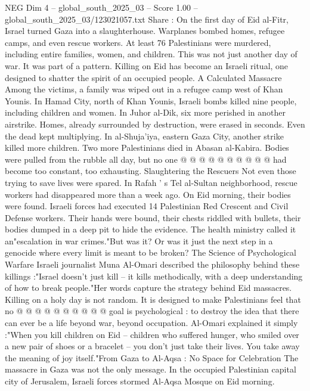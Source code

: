 \begin{textsample}{NEG Dim 4 – global\_south\_2025\_03 – Score 1.00 – global\_south\_2025\_03/123021057.txt}  \label{ex:f4_neg_427}
Share : On the first day of Eid al-Fitr, Israel turned Gaza into a slaughterhouse.
Warplanes bombed homes, refugee camps, and even rescue workers.
At least 76 Palestinians were murdered, including entire families, women, and children.
This was not just another day of war.
It was part of a pattern.
Killing on Eid has become an Israeli ritual, one designed to shatter the spirit of an occupied people.
A Calculated Massacre Among the victims, a family was wiped out in a refugee camp west of Khan Younis.
In Hamad City, north of Khan Younis, Israeli bombs killed nine people, including children and women.
In Juhor al-Dik, six more perished in another airstrike.
Homes, already surrounded by destruction, were erased in seconds.
Even the dead kept multiplying.
In al-Shuja'iya, eastern Gaza City, another strike killed more children.
Two more Palestinians died in Abasan al-Kabira.
Bodies were pulled from the rubble all day, but no one @ @ @ @ @ @ @ @ @ @ had become too constant, too exhausting.
Slaughtering the Rescuers Not even those trying to save lives were spared.
In Rafah ' s Tel al-Sultan neighborhood, rescue workers had disappeared more than a week ago.
On Eid morning, their bodies were found.
Israeli forces had executed 14 Palestinian Red Crescent and Civil Defense workers.
Their hands were bound, their chests riddled with bullets, their bodies dumped in a deep pit to hide the evidence.
The health ministry called it an"escalation in war crimes."But was it?
Or was it just the next step in a genocide where every limit is meant to be broken?
The Science of Psychological Warfare Israeli journalist Muna Al-Omari described the philosophy behind these killings :"Israel doesn't just kill -- it kills methodically, with a deep understanding of how to break people."Her words capture the strategy behind Eid massacres.
Killing on a holy day is not random.
It is designed to make Palestinians feel that no @ @ @ @ @ @ @ @ @ @ goal is psychological : to destroy the idea that there can ever be a life beyond war, beyond occupation.
Al-Omari explained it simply :"When you kill children on Eid -- children who suffered hunger, who smiled over a new pair of shoes or a bracelet -- you don't just take their lives.
You take away the meaning of joy itself."From Gaza to Al-Aqsa : No Space for Celebration The massacre in Gaza was not the only message.
In the occupied Palestinian capital city of Jerusalem, Israeli forces stormed Al-Aqsa Mosque on Eid morning.

\end{textsample}
